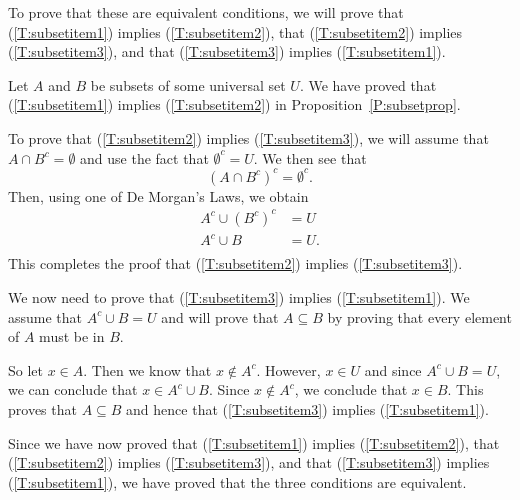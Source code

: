 \begin{myproof}
To prove that these are equivalent conditions, we will prove that (\ref{T:subsetitem1})  implies (\ref{T:subsetitem2}), that (\ref{T:subsetitem2})  implies (\ref{T:subsetitem3}), and that (\ref{T:subsetitem3}) implies (\ref{T:subsetitem1}).

Let  $A$  and  $B$  be subsets of some universal set  $U$.  We have proved that (\ref{T:subsetitem1}) implies (\ref{T:subsetitem2}) in Proposition~\ref{P:subsetprop}.
\vskip6pt

To prove that (\ref{T:subsetitem2}) implies (\ref{T:subsetitem3}), we will assume that  
$A \cap B^c  = \emptyset $ and use the fact that $\emptyset^c = U$.  We then see that
\[
\left( {A \cap B^c} \right)^c  = \emptyset^c.
\]
Then, using one of De Morgan's Laws, we obtain
\[
\begin{aligned}
A^c \cup \left(B^c \right)^c &= U \\
           A^c \cup B &= U. \\
\end{aligned}
\]
This completes the proof that (\ref{T:subsetitem2}) implies (\ref{T:subsetitem3}).

We now need to prove that (\ref{T:subsetitem3}) implies (\ref{T:subsetitem1}).  We assume that  $A^c  \cup B = U$ and will prove that  $A \subseteq B$ by proving that every element of  $A$  must be in $B$.

So let  $x \in A$.  Then we know that  $x \notin A^c $.  However,  $x \in U$ and since  $A^c  \cup B = U$, we can conclude that  $x \in A^c  \cup B$.  Since  $x \notin A^c $, we conclude that  $x \in B$.  This proves that  $A \subseteq B$ and hence that (\ref{T:subsetitem3}) implies (\ref{T:subsetitem1}).
\vskip6pt

Since we have now proved that (\ref{T:subsetitem1}) implies (\ref{T:subsetitem2}), that (\ref{T:subsetitem2}) implies (\ref{T:subsetitem3}), and that (\ref{T:subsetitem3}) implies (\ref{T:subsetitem1}), we have proved that the three conditions are equivalent.
\end{myproof}
\hbreak



\endinput
